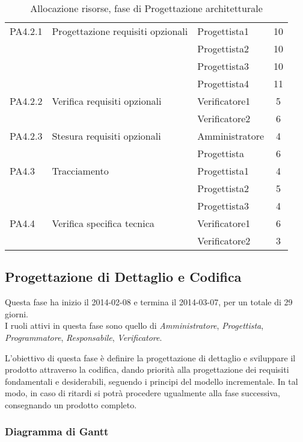 \begin{table}[H]
\begin{adjustwidth}{-4cm}{-4cm}
\begin{tabular}{ l l l c  }
	\cline{3-4}
	PA4.2.1 & Progettazione requisiti opzionali & Progettista1 & 10\\ 
	& & Progettista2 & 10\\
	& & Progettista3 & 10\\
	& & Progettista4 & 11\\
    \cline{3-4}
	PA4.2.2 & Verifica requisiti opzionali & Verificatore1 &  5\\
	& & Verificatore2 & 6\\
	\cline{3-4}
	PA4.2.3 & Stesura requisiti opzionali & Amministratore &  4\\
	& & Progettista & 6\\
	\cline{3-4}
	PA4.3 & Tracciamento & Progettista1 &  4\\
	& & Progettista2 & 5\\
	& & Progettista3 & 4\\
	\cline{3-4}
	PA4.4 & Verifica specifica tecnica & Verificatore1 &  6\\
	& & Verificatore2 & 3\\
	
	\hline
	\end{tabular}
	\caption{Allocazione risorse, fase di Progettazione architetturale}
	\end{adjustwidth}
	\end{table}
	
	\pagebreak
	\subsection{Progettazione di Dettaglio e Codifica}
	 
Questa fase ha inizio il 2014-02-08 e termina il 2014-03-07, per un totale di 29  giorni. \\
I ruoli attivi in questa fase sono quello di \textit{Amministratore}, \textit{Progettista}, \textit{Programmatore}, \textit{Responsabile}, \textit{Verificatore}.

L'obiettivo di questa fase è definire la progettazione di dettaglio e sviluppare il prodotto attraverso la codifica, dando priorità alla progettazione dei requisiti fondamentali e desiderabili, seguendo i principi del modello incrementale.
In tal modo, in caso di ritardi si potrà procedere ugualmente alla fase successiva, consegnando un prodotto completo.

\subsubsection{Diagramma di Gantt}

